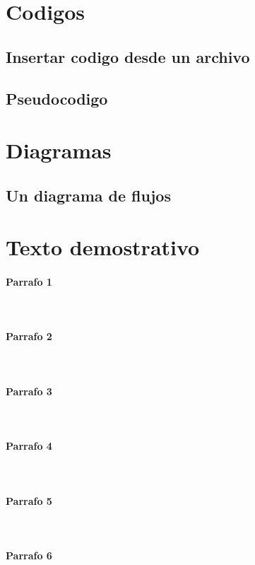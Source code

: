 \documentclass[12pt,a4paper,oneside]{article}
\title{\titulodoc}
\author{\autordoc}
\date{\fechadoc}
\begin{document}
\maketitle
\section{Codigos}
\subsection{Insertar codigo desde un archivo}
\subsection{Pseudocodigo}
\newpage
\section{Diagramas}
\subsection{Un diagrama de flujos}
\vspace{2cm}


\newpage
\section{Texto demostrativo}
\paragraph{Parrafo 1}
\lipsum[1]\\
\paragraph{Parrafo 2}
\lipsum[2]\\
\paragraph{Parrafo 3}
\lipsum[3]\\
\paragraph{Parrafo 4}
\lipsum[4]\\
\paragraph{Parrafo 5}
\lipsum[5]\\
\paragraph{Parrafo 6}
\lipsum[6]\\
\end{document}
